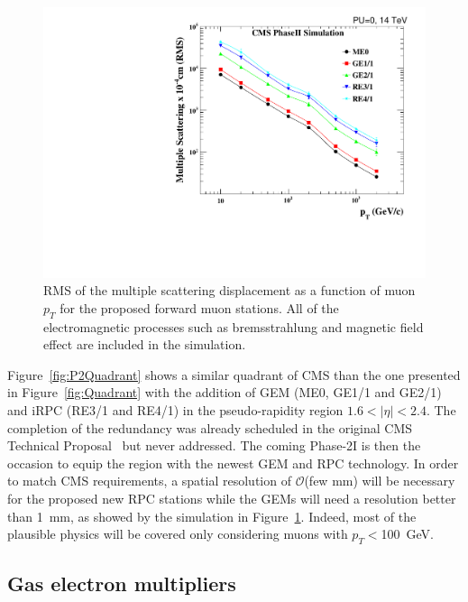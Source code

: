 	\newpage

\begingroup\setlength{\intextsep}{5pt}\setlength{\columnsep}{15pt}

	\begin{figure}
		\centering
		\includegraphics[width=\linewidth]{fig/chapt4/MS_allstations.pdf}
		\caption{\label{fig:MultiScat} RMS of the multiple scattering displacement as a function of muon $p_T$ for the proposed forward muon stations. All of the electromagnetic processes such as bremsstrahlung and magnetic field effect are included in the simulation.}
	\end{figure}
	
	Figure~\ref{fig:P2Quadrant} shows a similar quadrant of CMS than the one presented in Figure~\ref{fig:Quadrant} with the addition of \acf{GEM} (ME0, GE1/1 and GE2/1) and \acf{iRPC} (RE3/1 and RE4/1) in the pseudo-rapidity region $1.6<\vert\eta\vert<2.4$. The completion of the redundancy was already scheduled in the original CMS Technical Proposal~\cite{CMSTP} but never addressed. The coming Phase-2I is then the occasion to equip the region with the newest GEM and RPC technology. In order to match CMS requirements, a spatial resolution of $\mathcal{O}$(few $\mathrm{mm}$) will be necessary for the proposed new RPC stations while the GEMs will need a resolution better than \SI{1}{mm}, as showed by the simulation in Figure~\ref{fig:MultiScat}. Indeed, most of the plausible physics will be covered only considering muons with $p_T\!\!<$\SI{100}{GeV}.
	
\endgroup
	
	\subsection{Gas electron multipliers}
	\label{chapt4:ssec:GEMs}

